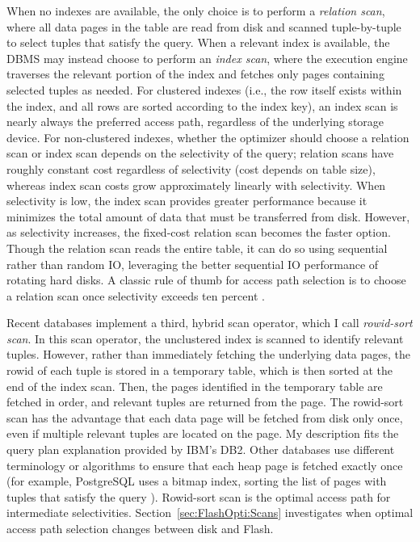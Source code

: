 When no indexes are available, the only choice is to perform a \emph{relation scan}, where all data pages in the table are read from disk and scanned tuple-by-tuple to select tuples that satisfy the query.
When a relevant index is available, the DBMS may instead choose to perform an \emph{index scan}, where the execution engine traverses the relevant portion of the index and fetches only pages containing selected tuples as needed.
For clustered indexes (i.e., the row itself exists within the index, and all rows are sorted according to the index key), an index scan is nearly always the preferred access path, regardless of the underlying storage device.  
For non-clustered indexes, whether the optimizer should choose a relation scan or index scan depends on the selectivity of the query; relation scans have roughly constant cost regardless of selectivity (cost depends on table size), whereas index scan costs grow approximately linearly with selectivity.
When selectivity is low, the index scan provides greater performance because it minimizes the total amount of data that must be transferred from disk.
However, as selectivity increases, the fixed-cost relation scan becomes the faster option.  
Though the relation scan reads the entire table, it can do so using sequential rather than random IO, leveraging the better sequential IO performance of rotating hard disks.
A classic rule of thumb for access path selection is to choose a relation scan once selectivity exceeds ten percent \cite{RamakrishnanAndGehrke}.

Recent databases implement a third, hybrid scan operator, which I call \emph{rowid-sort scan}.
In this scan operator, the unclustered index is scanned to identify relevant tuples.
However, rather than immediately fetching the underlying data pages, the rowid of each tuple is stored in a temporary table, which is then sorted at the end of the index scan.
Then, the pages identified in the temporary table are fetched in order, and relevant tuples are returned from the page.
The rowid-sort scan has the advantage that each data page will be fetched from disk only once, even if multiple relevant tuples are located on the page. 
My description fits the query plan explanation provided by IBM's DB2.
Other databases use different terminology or algorithms to ensure that each heap page is fetched exactly once (for example, PostgreSQL uses a bitmap index, sorting the list of pages with tuples that satisfy the query \cite{PostgresLossyBitMap}).
Rowid-sort scan is the optimal access path for intermediate selectivities.
Section~\ref{sec:FlashOpti:Scans} investigates when optimal access path selection changes between disk and Flash.

